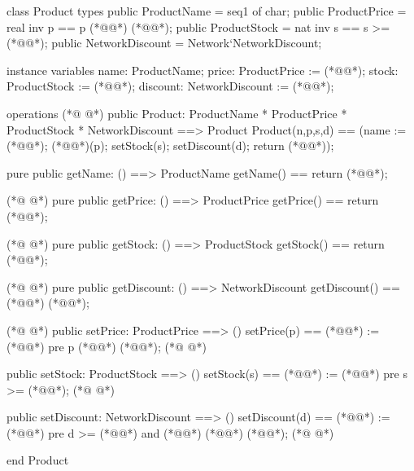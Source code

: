 \begin{vdmpp}[breaklines=true]
class Product
types
 public ProductName = seq1 of char;
 public ProductPrice = real inv p == p (*@\vdmnotcovered{>=}@*) (*@@*);
 public ProductStock = nat inv s == s >= (*@@*);
 public NetworkDiscount = Network`NetworkDiscount;

instance variables
 name: ProductName; 
 price: ProductPrice := (*@@*);
 stock: ProductStock := (*@@*);
 discount: NetworkDiscount := (*@@*);
 
operations 
(*@
\label{Product:15}
@*)
 public Product: ProductName * ProductPrice * ProductStock * NetworkDiscount ==> Product
 Product(n,p,s,d) == (name := (*@@*); (*@@*)(p); setStock(s); setDiscount(d); return (*@@*));
 
 pure public getName: () ==> ProductName
 getName() == return (*@@*);
 
(*@
\label{getName:21}
@*)
 pure public getPrice: () ==> ProductPrice
 getPrice() == return (*@@*);
 
(*@
\label{getPrice:24}
@*)
 pure public getStock: () ==> ProductStock
 getStock() == return (*@@*);
 
(*@
\label{getStock:27}
@*)
 pure public getDiscount: () ==> NetworkDiscount
 getDiscount() == (*@@*) (*@@*);
 
(*@
\label{getDiscount:30}
@*)
 public setPrice: ProductPrice ==> ()
 setPrice(p) == (*@@*) := (*@@*)
 pre p (*@\vdmnotcovered{>=}@*) (*@@*);
(*@
\label{setPrice:33}
@*)
 
 public setStock: ProductStock ==> ()
 setStock(s) == (*@@*) := (*@@*)
 pre s >= (*@@*);
(*@
\label{setStock:37}
@*)
 
 public setDiscount: NetworkDiscount ==> ()
 setDiscount(d) == (*@@*) := (*@@*)
 pre d >= (*@@*) and (*@@*) (*@\vdmnotcovered{<=}@*) (*@@*);
(*@
\label{setDiscount:41}
@*)

end Product
\end{vdmpp}
\bigskip
